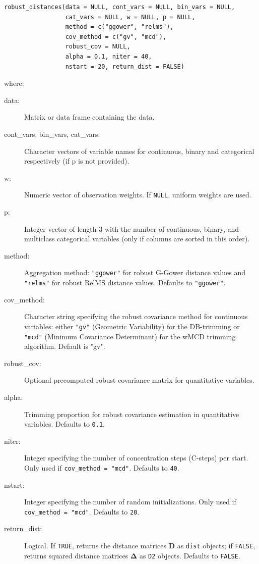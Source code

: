 \begin{verbatim}
robust_distances(data = NULL, cont_vars = NULL, bin_vars = NULL, 
                 cat_vars = NULL, w = NULL, p = NULL, 
                 method = c("ggower", "relms"), 
                 cov_method = c("gv", "mcd"), 
                 robust_cov = NULL, 
                 alpha = 0.1, niter = 40,
                 nstart = 20, return_dist = FALSE)
\end{verbatim}
where:
\begin{description}
\item[data:] Matrix or data frame containing the data.
\item[cont\_vars, bin\_vars, cat\_vars:] Character vectors of variable names for continuous, binary and categorical respectively (if p is not provided).
\item[w:] Numeric vector of observation weights. If \texttt{NULL}, uniform weights are used.
\item[p:] Integer vector of length 3 with the number of continuous, binary, and multiclass categorical variables (only if columns are sorted in this order).
\item[method:] Aggregation method: \texttt{"ggower"} for robust G-Gower distance values and 
    \texttt{"relms"} for robust RelMS distance values. Defaults to \texttt{"ggower"}.
\item[cov\_method:] Character string specifying the robust covariance method for continuous variables:
either \texttt{"gv"} (Geometric Variability) for the DB-trimming or \texttt{"mcd"} (Minimum Covariance Determinant) for the wMCD trimming algorithm.
Default is "gv".
\item[robust\_cov:] Optional precomputed robust covariance matrix for quantitative variables.
\item[alpha:] Trimming proportion for robust covariance estimation in quantitative variables. Defaults to \texttt{0.1}.
\item[niter:] Integer specifying the number of concentration steps (C-steps) per start. Only
used if \texttt{cov\_method = "mcd"}. Defaults to \texttt{40}.
\item[nstart:] Integer specifying the number of random initializations. Only used if \texttt{cov\_method
= "mcd"}. Defaults to \texttt{20}.
\item[return\_dist:] Logical. If \texttt{TRUE}, returns the distance matrices $\mathbf{D}$ as \texttt{dist} objects; if \texttt{FALSE}, returns squared distance matrices $\mathbf{\Delta}$ as \texttt{D2} objects. Defaults to \texttt{FALSE}.
\end{description}


